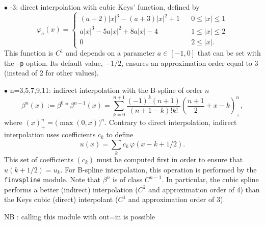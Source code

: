 $\bullet$ -3: direct interpolation with cubic Keys' function, defined by
$$\varphi_a(x) = \left\{\begin{array}{lcl}
(a+2)|x|^3 - (a+3)|x|^2+1       & & 0 \leq |x| \leq 1 \\ 
a|x|^3 - 5a|x|^2+8a|x|-4        & & 1 \leq |x| \leq 2 \\ 
0                               & & 2 \leq |x|.
\end{array}\right.$$
This function is $C^1$ and depends on a parameter $a \in [-1,0]$ that 
can be set with the \verb+-p+ option. Its default value, $-1/2$,
ensures an approximation order equal to 3 (instead of 2 for other
values).

\smallskip

$\bullet$ n=3,5,7,9,11: indirect interpolation 
with the B-spline of order $n$
$$\beta^n(x) := \beta^0*\beta^{n-1}(x) =
\sum_{k=0}^{n+1}\frac{(-1)^k(n+1)}{(n+1-k)!k!}
\left(\frac{n+1}2+x-k\right)^n_+,$$
where $(x)^n_+ = \big(\max(0,x)\big)^n$.
Contrary to direct interpolation, 
indirect interpolation uses coefficients $c_k$ to define
$$u(x) = \sum_k c_k \,\varphi(x-k+1/2).$$
This set of coefficients $(c_k)$ must be computed first in order
to ensure that $u(k+1/2)=u_k$. For B-spline interpolation, this
operation is performed by the \verb+finvspline+ module.
Note that $\beta^n$ is of class $C^{n-1}$. In particular, the
cubic spline performs a better (indirect) interpolation ($C^2$ and
approximation order of 4) than the Keys cubic (direct) interpolant 
($C^1$ and approximation order of 3).

\medskip

NB : calling this module with out=in is possible

